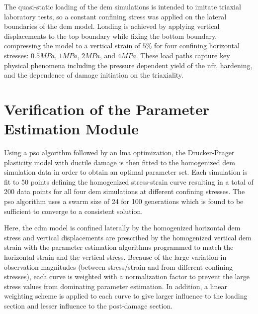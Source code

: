 The quasi-static loading of the \acrshort{dem} simulations is intended to imitate triaxial laboratory tests, so a constant confining stress was applied on the lateral boundaries of the \acrshort{dem} model. Loading is achieved by applying vertical displacements to the top boundary while fixing the bottom boundary, compressing the model to a vertical strain of $5\%$ for four confining horizontal stresses: $0.5MPa$, $1MPa$, $2MPa$, and $4MPa$. These load paths capture key physical phenomena including the pressure dependent yield of the \acrshort{nfr}, hardening, and the dependence of damage initiation on the triaxiality. 


\section{Verification of the Parameter Estimation Module}

Using a \acrshort{pso} algorithm followed by an \acrshort{lma} optimization, the Drucker-Prager plasticity model with ductile damage is then fitted to the homogenized \acrshort{dem} simulation data in order to obtain an optimal parameter set. Each simulation is fit to 50 points defining the homogenized stress-strain curve resulting in a total of 200 data points for all four \acrshort{dem} simulations at different confining stresses. The \acrshort{pso} algorithm uses a swarm size of 24 for 100 generations which is found to be sufficient to converge to a consistent solution. 

Here, the \acrshort{cdm} model is confined laterally by the homogenized horizontal \acrshort{dem} stress and vertical displacements are prescribed by the homogenized vertical \acrshort{dem} strain with the parameter estimation algorithms programmed to match the horizontal strain and the vertical stress. Because of the large variation in observation magnitudes (between stress/strain and from different confining stresses), each curve is weighted with a normalization factor to prevent the large stress values from dominating parameter estimation. In addition, a linear weighting scheme is applied to each curve to give larger influence to the loading section and lesser influence to the post-damage section.

